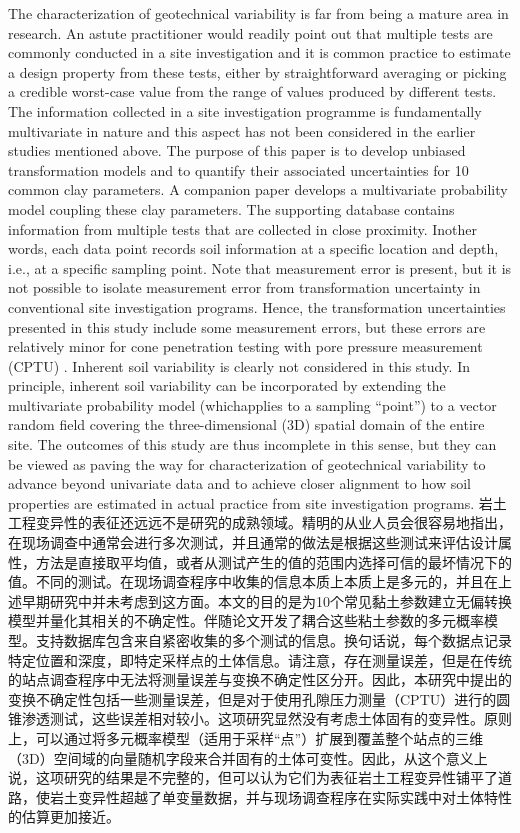 \begin{Parallel}{0.60\textwidth}{}
{        The characterization of geotechnical variability is far from being a mature area in research. An astute practitioner would readily point out that multiple tests are commonly conducted in a site investigation and it is common practice to estimate a design property from these tests, either by straightforward averaging or picking a credible worst-case value from the range of values produced by different tests. The information collected in a site investigation programme is fundamentally multivariate in nature and this aspect has not been considered in the earlier studies mentioned above. The purpose of this paper is to develop unbiased transformation models and to quantify their associated uncertainties for 10 common clay parameters. A companion paper \citep{Ching2014686} develops a multivariate probability model coupling these clay parameters. The supporting database contains information from multiple tests that are collected in close proximity. Inother words, each data point records soil information at a specific location and depth, i.e., at a specific sampling point. Note that measurement error is present, but it is not possible to isolate measurement error from transformation uncertainty in conventional site investigation programs. Hence, the transformation uncertainties presented in this study include some measurement errors, but these errors are relatively minor for cone penetration testing with pore pressure measurement (CPTU) \citep{Phoon1999612}. Inherent soil variability is clearly not considered in this study. In principle, inherent soil variability can be incorporated by extending the multivariate probability model (whichapplies to a sampling “point”) to a vector random field covering the three-dimensional (3D) spatial domain of the entire site. The outcomes of this study are thus incomplete in this sense, but they can be viewed as paving the way for characterization of geotechnical variability to advance beyond univariate data and to achieve closer alignment to how soil properties are estimated in actual practice from site investigation programs.
    }
    \ParallelRText
    {
        岩土工程变异性的表征还远远不是研究的成熟领域。精明的从业人员会很容易地指出，在现场调查中通常会进行多次测试，并且通常的做法是根据这些测试来评估设计属性，方法是直接取平均值，或者从测试产生的值的范围内选择可信的最坏情况下的值。不同的测试。在现场调查程序中收集的信息本质上本质上是多元的，并且在上述早期研究中并未考虑到这方面。本文的目的是为10个常见黏土参数建立无偏转换模型并量化其相关的不确定性。伴随论文\citep{Ching2014686}开发了耦合这些粘土参数的多元概率模型。支持数据库包含来自紧密收集的多个测试的信息。换句话说，每个数据点记录特定位置和深度，即特定采样点的土体信息。请注意，存在测量误差，但是在传统的站点调查程序中无法将测量误差与变换不确定性区分开。因此，本研究中提出的变换不确定性包括一些测量误差，但是对于使用孔隙压力测量（CPTU）进行的圆锥渗透测试，这些误差相对较小\citep{Phoon1999612}。这项研究显然没有考虑土体固有的变异性。原则上，可以通过将多元概率模型（适用于采样“点”）扩展到覆盖整个站点的三维（3D）空间域的向量随机字段来合并固有的土体可变性。因此，从这个意义上说，这项研究的结果是不完整的，但可以认为它们为表征岩土工程变异性铺平了道路，使岩土变异性超越了单变量数据，并与现场调查程序在实际实践中对土体特性的估算更加接近。
}
\end{Parallel}
